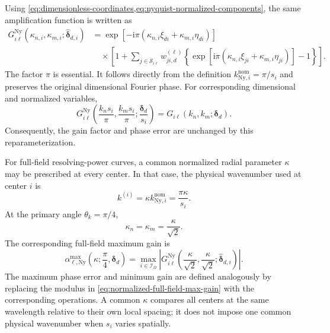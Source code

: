 \documentclass[11pt]{article}
\numberwithin{equation}{section}
\newcommand{\ii}{\mathrm{i}}
\begin{document}
Using \cref{eq:dimensionless-coordinates,eq:nyquist-normalized-components}, the same amplification function is written as
\begin{equation}
\boxed{
\begin{aligned}
    G_{i\ell}^{\mathrm{Ny}}
    \!\left(
        \kappa_{n,i},\kappa_{m,i};
        \widehat{\bm{\delta}}_{d,i}
    \right)
    &=
    \exp\!\left[-\ii\pi\left(
        \kappa_{n,i}\xi_{di}
        +
        \kappa_{m,i}\eta_{di}
    \right)\right]
    \\
    &\quad\times
    \left[
        1+
        \sum_{j\in\mathcal S_{i\ell}}
        w_{ji,d}^{(\ell)}
        \left\{
            \exp\!\left[\ii\pi\left(
                \kappa_{n,i}\xi_{ji}
                +
                \kappa_{m,i}\eta_{ji}
            \right)\right]-1
        \right\}
    \right].
\end{aligned}
}
\label{eq:G-nyquist-normalized}
\end{equation}
The factor $\pi$ is essential. It follows directly from the definition $k_{\mathrm{Ny},i}^{\mathrm{nom}}=\pi/s_i$ and preserves the original dimensional Fourier phase. For corresponding dimensional and normalized variables,
\begin{equation}
    \boxed{
    G_{i\ell}^{\mathrm{Ny}}
    \!\left(
        \frac{k_ns_i}{\pi},
        \frac{k_ms_i}{\pi};
        \frac{\bm{\delta}_d}{s_i}
    \right)
    =
    G_{i\ell}\!\left(k_n,k_m;\bm{\delta}_d\right).
    }
    \label{eq:nyquist-G-equivalence}
\end{equation}
Consequently, the gain factor and phase error are unchanged by this reparameterization.

For full-field resolving-power curves, a common normalized radial parameter $\kappa$ may be prescribed at every center. In that case, the physical wavenumber used at center $i$ is
\begin{equation}
    k^{(i)}=\kappa k_{\mathrm{Ny},i}^{\mathrm{nom}}=\frac{\pi\kappa}{s_i}.
    \label{eq:local-physical-k-from-normalized}
\end{equation}
At the primary angle $\theta_k=\pi/4$,
\begin{equation}
    \kappa_n=\kappa_m=\frac{\kappa}{\sqrt{2}}.
    \label{eq:normalized-primary-angle}
\end{equation}
The corresponding full-field maximum gain is
\begin{equation}
    \boxed{
    \alpha_{\ell,\mathrm{Ny}}^{\max}
    \!\left(\kappa;\frac{\pi}{4},\bm{\delta}_d\right)
    =
    \max_{i\in\mathcal I_{\Omega}}
    \left|
        G_{i\ell}^{\mathrm{Ny}}
        \!\left(
            \frac{\kappa}{\sqrt{2}},
            \frac{\kappa}{\sqrt{2}};
            \widehat{\bm{\delta}}_{d,i}
        \right)
    \right|.
    }
    \label{eq:normalized-full-field-max-gain}
\end{equation}
The maximum phase error and minimum gain are defined analogously by replacing the modulus in \cref{eq:normalized-full-field-max-gain} with the corresponding operations. A common $\kappa$ compares all centers at the same wavelength relative to their own local spacing; it does not impose one common physical wavenumber when $s_i$ varies spatially.
\end{document}
